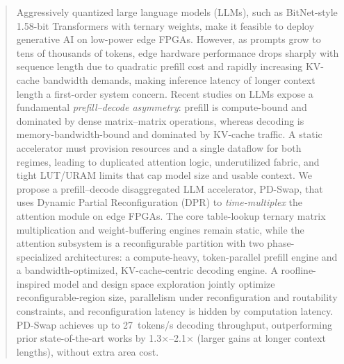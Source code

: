\documentclass[9pt,sigconf]{acmart}
\begin{document}
\begin{abstract}
Aggressively quantized large language models (LLMs), such as BitNet-style 1.58-bit Transformers with ternary weights, make it feasible to deploy generative AI on low-power edge FPGAs. However, as prompts grow to tens of thousands of tokens, edge hardware performance drops sharply with sequence length due to quadratic prefill cost and rapidly increasing KV-cache bandwidth demands, making inference latency of longer context length a first-order system concern. Recent studies on LLMs expose a fundamental \emph{prefill--decode asymmetry}: prefill is compute-bound and dominated by dense matrix--matrix operations, whereas decoding is memory-bandwidth-bound and dominated by KV-cache traffic. A static accelerator must provision resources and a single dataflow for both regimes, leading to duplicated attention logic, underutilized fabric, and tight LUT/URAM limits that cap model size and usable context. We propose a prefill--decode disaggregated LLM accelerator, PD-Swap, that uses Dynamic Partial Reconfiguration (DPR) to \emph{time-multiplex} the attention module on edge FPGAs. The core table-lookup ternary matrix multiplication and weight-buffering engines remain static, while the attention subsystem is a reconfigurable partition with two phase-specialized architectures: a compute-heavy, token-parallel prefill engine and a bandwidth-optimized, KV-cache-centric decoding engine. A roofline-inspired model and design space exploration jointly optimize reconfigurable-region size, parallelism under reconfiguration and routability constraints, and reconfiguration latency is hidden by computation latency. PD-Swap achieves up to 27~tokens/s decoding throughput, outperforming prior state-of-the-art works by 1.3$\times$--2.1$\times$ (larger gains at longer context lengths), without extra area cost.
\end{abstract}

\maketitle

\end{document}
